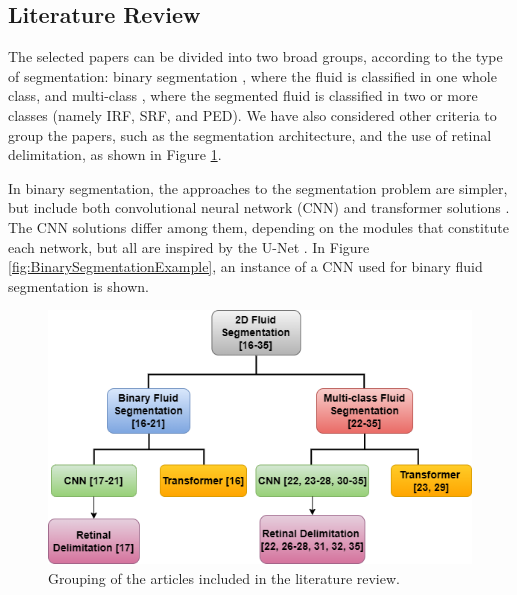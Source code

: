 \subsection{Literature Review}\label{FluidSegmentationLiteratureReview}
The selected papers can be divided into two broad groups, according to the type of segmentation: binary segmentation \parencite{Quek2022, Pawan2021, Liu2021, Guo2020, Wang2021, Wu2023}, where the fluid is classified in one whole class, and multi-class \parencite{Rahil2023, Hassan2021a, Zhang2023, Sappa2021, Xing2022, Tang2022, Padilla2022, Hu2019, Mantel2021, Liu2024, Li2023, Gao2019, Hassan2021b, Lu2019}, where the segmented fluid is classified in two or more classes (namely IRF, SRF, and PED). We have also considered other criteria to group the papers, such as the segmentation architecture, and the use of retinal delimitation, as shown in Figure \ref{fig:ArticlesSelection}.
\par
In binary segmentation, the approaches to the segmentation problem are simpler, but include both convolutional neural network (CNN) \parencite{Pawan2021, Liu2021, Guo2020, Wang2021, Wu2023} and transformer solutions \parencite{Quek2022}. The CNN solutions differ among them, depending on the modules that constitute each network, but all are inspired by the U-Net \parencite{Ronneberger2015}. In Figure \ref{fig:BinarySegmentationExample}, an instance of a CNN used for binary fluid segmentation is shown.
\begin{figure}[!ht]
	\centering
	\includegraphics[width=0.75\linewidth]{figures/ArticlesSelection.png}
	\caption{Grouping of the articles included in the literature review.}
	\label{fig:ArticlesSelection}
\end{figure}
